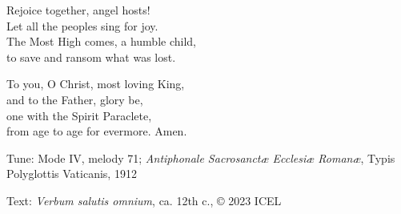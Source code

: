 \hymn



\begin{underhymnverse}
Rejoice together, angel hosts!\\
Let all the peoples sing for joy.\\
The Most High comes, a humble child,\\
to save and ransom what was lost.

To you, O Christ, most loving King,\\
and to the Father, glory be,\\
one with the Spirit Paraclete,\\
from age to age for evermore. Amen.
\end{underhymnverse}

\begin{hymnsource}
Tune: Mode IV, melody 71; \emph{Antiphonale Sacrosanctæ Ecclesiæ Romanæ}, Typis Polyglottis Vaticanis, 1912

Text: \emph{Verbum salutis omnium}, ca. 12th c., © 2023 ICEL
\end{hymnsource}
